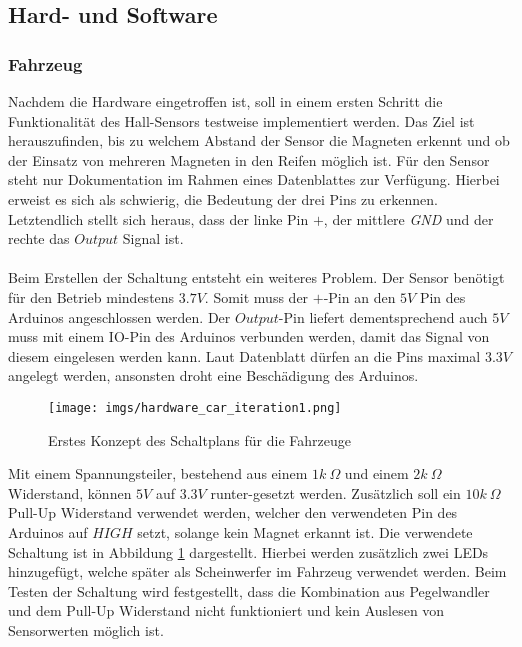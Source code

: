 \documentclass[.../Dokumentation.tex]{subfiles}
\begin{document}
\subsection{Hard- und Software}
\label{sec-ita1-hardware}

\subsubsection*{Fahrzeug}
Nachdem die Hardware eingetroffen ist, soll in einem ersten Schritt 
die Funktionalität des Hall-Sensors testweise implementiert werden. Das Ziel 
ist herauszufinden, bis zu welchem Abstand der Sensor die Magneten erkennt und 
ob der Einsatz von mehreren Magneten in den Reifen möglich ist. Für den Sensor 
steht nur Dokumentation im Rahmen eines Datenblattes zur Verfügung. Hierbei erweist es sich als schwierig, die Bedeutung der drei Pins zu 
erkennen. Letztendlich stellt sich heraus, dass der linke Pin $+$, der 
mittlere \textit{GND} und der rechte das $Output$ Signal ist.\\\\
Beim Erstellen der Schaltung entsteht ein weiteres Problem. Der Sensor benötigt für den Betrieb mindestens $3.7V$. Somit muss der $+$-Pin an den $5V$ Pin des 
Arduinos angeschlossen werden. Der $Output$-Pin liefert dementsprechend auch $5V$ muss mit einem IO-Pin des Arduinos verbunden werden, damit das 
Signal von diesem eingelesen werden kann. Laut Datenblatt dürfen an die Pins maximal $3.3V$ angelegt werden, ansonsten droht eine Beschädigung des Arduinos.
\begin{figure}[H]
\begin{center}
    \texttt{[image: imgs/hardware\_car\_iteration1.png]}
    \caption{Erstes Konzept des Schaltplans für die Fahrzeuge}
    \label{fig-hardware-car-iteration1}
\end{center}
\end{figure}
\noindent
Mit einem Spannungsteiler, bestehend aus einem $1k\ \Omega$ und einem $2k\ \Omega$ Widerstand, können $5V$ 
auf $3.3V$ runter-gesetzt werden. Zusätzlich soll ein 
$10k\ \Omega$ Pull-Up Widerstand verwendet werden, welcher den verwendeten Pin 
des Arduinos auf $HIGH$ setzt, solange kein Magnet erkannt ist. Die verwendete Schaltung ist in Abbildung \ref{fig-hardware-car-iteration1} dargestellt. 
Hierbei werden zusätzlich zwei LEDs hinzugefügt, welche später als Scheinwerfer im Fahrzeug verwendet werden. Beim Testen der Schaltung wird festgestellt, dass die Kombination aus Pegelwandler und dem Pull-Up Widerstand nicht funktioniert und kein Auslesen von Sensorwerten möglich ist.
\end{document}

